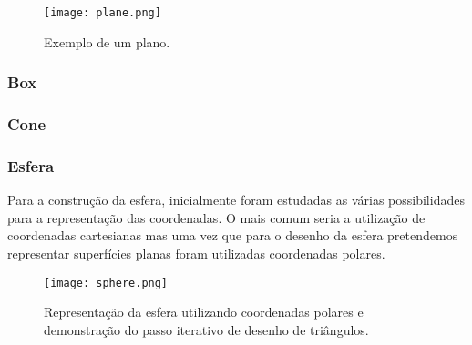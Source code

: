 \documentclass[a4paper]{article}
\begin{document}
\begin{figure}[h!]
\centering
\texttt{[image: plane.png]}
\caption{Exemplo de um plano.}
\label{fig:plane}
\end{figure}

\subsubsection{Box} %

\subsubsection{Cone} %

\subsubsection{Esfera} %

\hspace{3mm} Para a construção da esfera, inicialmente foram estudadas as várias possibilidades para a representação das coordenadas. O mais comum seria a utilização de coordenadas cartesianas mas uma vez que para o desenho da esfera pretendemos representar superfícies planas foram utilizadas coordenadas polares.

\begin{figure}[h!]
\centering
\texttt{[image: sphere.png]}
\caption{Representação da esfera utilizando coordenadas polares e demonstração do passo iterativo de desenho de triângulos.}
\label{fig:sphere}
\end{figure}
\end{document}
